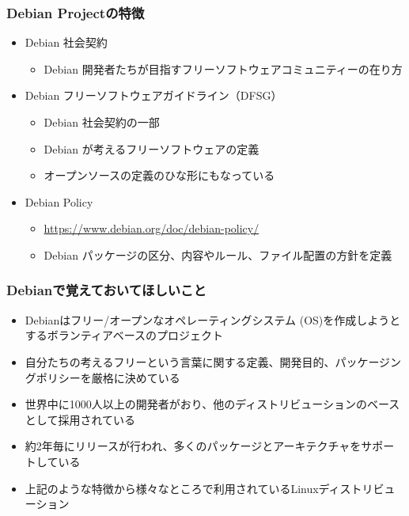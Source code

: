 \documentclass[mingoth,a4paper]{jsarticle}
\begin{document}
\subsubsection{Debian Projectの特徴}

\begin{itemize}
  \item Debian 社会契約
    \begin{itemize}
      \item Debian 開発者たちが目指すフリーソフトウェアコミュニティーの在り方
    \end{itemize}
  \item Debian フリーソフトウェアガイドライン（DFSG）
    \begin{itemize}
      \item Debian 社会契約の一部
      \item Debian が考えるフリーソフトウェアの定義
      \item オープンソースの定義のひな形にもなっている
    \end{itemize}
  \item Debian Policy
    \begin{itemize}
      \item \url{https://www.debian.org/doc/debian-policy/}
      \item Debian パッケージの区分、内容やルール、ファイル配置の方針を定義
    \end{itemize}
\end{itemize}


\subsubsection{Debianで覚えておいてほしいこと}

\begin{itemize}
  \item Debianはフリー/オープンなオペレーティングシステム (OS)を作成しようとするボランティアベースのプロジェクト
  \item 自分たちの考えるフリーという言葉に関する定義、開発目的、パッケージングポリシーを厳格に決めている
  \item 世界中に1000人以上の開発者がおり、他のディストリビューションのベースとして採用されている
  \item 約2年毎にリリースが行われ、多くのパッケージとアーキテクチャをサポートしている
  \item 上記のような特徴から様々なところで利用されているLinuxディストリビューション
\end{itemize}
\end{document}
